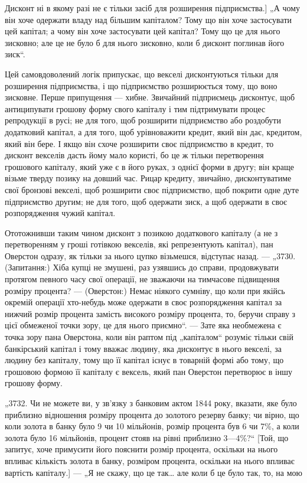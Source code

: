 \parcont{}  %
Дисконт ні в якому разі не є тільки засіб для розширення підприємства.] „А чому він хоче одержати
владу над більшим капіталом? Тому що він хоче застосувати цей капітал; а чому він
хоче застосувати цей капітал? Тому що це для нього зисковно;
але це не було б для нього зисковно, коли б дисконт поглинав
його зиск“.

Цей самовдоволений логік припускає, що векселі дисконтуються тільки для розширення підприємства, і
що підприємство
розширюється тому, що воно зисковне. Перше припущення — хибне. Звичайний підприємець дисконтує, щоб
антиципувати грошову форму свого капіталу і тим підтримувати процес репродукції в русі; не для того,
щоб розширити підприємство або роздобути додатковий капітал, а для того, щоб урівноважити кредит,
який він дає, кредитом, який він бере. І якщо він схоче
розширити своє підприємство в кредит, то дисконт векселів
дасть йому мало користі, бо це ж тільки перетворення грошового капіталу, який уже є в його руках, з
однієї форми
в другу; він краще візьме тверду позику на довший час.
Рицар кредиту, звичайно, дисконтуватиме свої бронзові векселі,
щоб розширити своє підприємство, щоб покрити одне дуте підприємство другим; не для того, щоб
одержати зиск, а щоб одержати в своє розпорядження чужий капітал.

Ототожнивши таким чином дисконт з позикою додаткового
капіталу (а не з перетворенням у гроші готівкою векселів, які
репрезентують капітал), пан Оверстон одразу, як тільки за нього
цупко візьмешся, відступає назад. — „3730. (Запитання:) Хіба
купці не змушені, раз узявшись до справи, продовжувати протягом певного часу свої операції, не
зважаючи на тимчасове
підвищення розміру процента? — (Оверстон:) Немає ніякого
сумніву, що коли при якійсь окремій операції хто-небудь може
одержати в своє розпорядження капітал за нижчий розмір
процента замість високого розміру процента, то, беручи справу
з цієї обмеженої точки зору, це для нього приємно“. — Зате
яка необмежена є точка зору пана Оверстона, коли він раптом
під „капіталом“ розуміє тільки свій банкірський капітал і тому
вважає людину, яка дисконтує в нього векселі, за людину без
капіталу, тому що її капітал існує в товарній формі або тому,
що грошовою формою її капіталу є вексель, який пан Оверстон
перетворює в іншу грошову форму.

„3732. Чи не можете ви, у зв’язку з банковим актом 1844 року,
вказати, яке було приблизно відношення розміру процента до
золотого резерву банку; чи вірно, що коли золота в банку було
9 чи 10 мільйонів, розмір процента був 6 чи 7\%, а коли золота
було 16 мільйонів, процент стояв на рівні приблизно 3—4\%?“
[Той, що запитує, хоче примусити його пояснити розмір процента, оскільки на нього впливає кількість
золота в банку, розміром процента, оскільки на нього впливає вартість капіталу.] —
„Я не скажу, що це так\dots{} але коли б це було так, то, на мою
\parbreak{}  %

